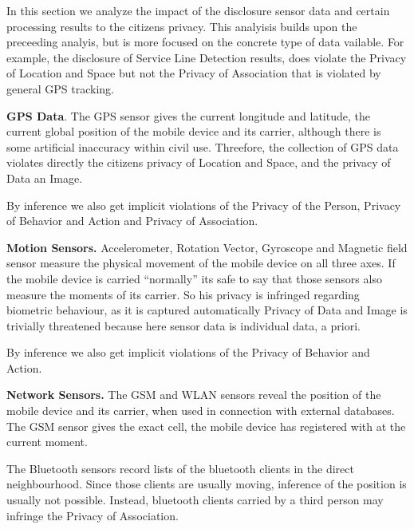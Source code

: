 \documentclass[runningheads,a4paper]{llncs}
\newenvironment{LGContent-Hidden}{ \comment  }{ }
\begin{document}
\begin{LGContent-Hidden}



In this section we analyze the impact of the disclosure sensor data and certain processing results to the citizens privacy.
This analyisis builds upon the preceeding analyis, but is more focused on the concrete type of data vailable.
For example, the disclosure of Service Line Detection results, does violate the Privacy of Location and Space but not the Privacy of Association that is violated by general GPS tracking.

\textbf{GPS Data}.
The GPS sensor gives the current longitude and latitude, the current global position of the mobile device and its carrier, although there is some artificial inaccuracy within civil use. Threefore, the collection of GPS data violates directly the citizens privacy of Location and Space, and the privacy of Data an Image.

By inference we also get implicit violations of the Privacy of the Person, Privacy of Behavior and Action and Privacy of Association.

\textbf{Motion Sensors.}
Accelerometer, Rotation Vector, Gyroscope and Magnetic field sensor measure the physical movement of the mobile device on all three axes.
If the mobile device is carried ``normally'' its safe to say that those sensors also measure the moments of its carrier.
So his privacy is infringed regarding biometric behaviour, as it is captured automatically
Privacy of Data and Image is trivially threatened because here sensor data is individual data, a priori.

By inference we also get implicit violations of the Privacy of Behavior and Action.

\textbf{Network Sensors.}
The GSM and WLAN sensors reveal the position of the mobile device and its carrier, when used in connection with external databases.
The GSM sensor gives the exact cell, the mobile device has registered with at the current moment.

The Bluetooth sensors record lists of the bluetooth clients in the direct neighbourhood.
Since those clients are usually moving, inference of the position is usually not possible.
Instead, bluetooth clients carried by a third person may infringe the Privacy of Association.


\end{LGContent-Hidden}
\end{document}
